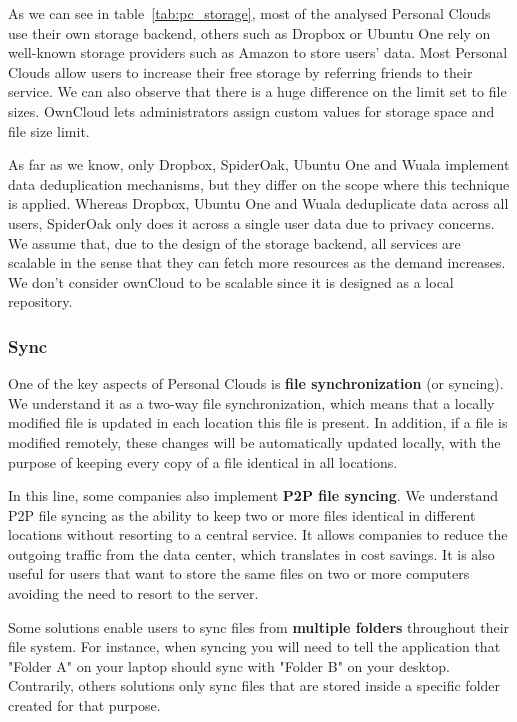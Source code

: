 As we can see in table~\ref{tab:pc_storage}, most of the analysed Personal Clouds use their own storage backend, others such as Dropbox or Ubuntu One rely on well-known storage providers such as Amazon to store users' data. Most Personal Clouds allow users to increase their free storage by referring friends to their service. We can also observe that there is a huge difference on the limit set to file sizes. OwnCloud lets administrators assign custom values for storage space and file size limit.

As far as we know, only Dropbox, SpiderOak, Ubuntu One and Wuala implement data deduplication mechanisms, but they differ on the scope where this technique is applied. Whereas Dropbox, Ubuntu One and Wuala deduplicate data across all users, SpiderOak only does it across a single user data due to privacy concerns. We assume that, due to the design of the storage backend, all services are scalable in the sense that they can fetch more resources as the demand increases. We don't consider ownCloud to be scalable since it is designed as a local repository.

\subsubsection{Sync}
One of the key aspects of Personal Clouds is \textbf{file synchronization} (or syncing). We understand it as a two-way file synchronization, which means that a locally modified file is updated in each location this file is present. In addition, if a file is modified remotely, these changes will be automatically updated locally, with the purpose of keeping every copy of a file identical in all locations.

In this line, some companies also implement \textbf{P2P file syncing}. We understand P2P file syncing as the ability to keep two or more files identical in different locations without resorting to a central service. It allows companies to reduce the outgoing traffic from the data center, which translates in cost savings. It is also useful for users that want to store the same files on two or more computers avoiding the need to resort to the server.

Some solutions enable users to sync files from \textbf{multiple folders} throughout their file system. For instance, when syncing you will need to tell the application that "Folder A" on your laptop should sync with "Folder B" on your desktop. Contrarily, others solutions only sync files that are stored inside a specific folder created for that purpose.

